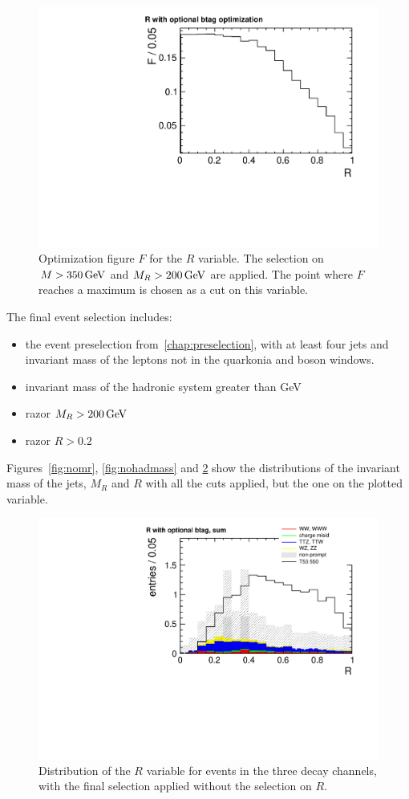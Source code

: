 \begin{figure}[phtb]
    \centering
    \includegraphics[width=.7\textwidth]{images/pdf/cut_opt_r_optional_btag_4jets_AND_mr200_AND_had_mass350}
    \caption{Optimization figure $F$ for the $R$ variable. The selection
        on $M > \unit[350]{GeV}$ and $M_R > \unit[200]{GeV}$ are
    applied. The point where $F$ reaches a maximum is chosen as a cut on this variable.}
    \label{fig:opt_r}
\end{figure}

The final event selection includes:
\begin{itemize}\label{page:razor_selection}
    \item the event preselection from~\ref{chap:preselection}, with at least
        four jets and invariant mass of the leptons not in the quarkonia and
        \Z boson windows.
    \item invariant mass of the hadronic system greater than
        \unit[350]{GeV}
    \item razor $M_R > \unit[200]{GeV}$
    \item razor $R > 0.2$
\end{itemize}
Figures~\ref{fig:nomr}, \ref{fig:nohadmass} and \ref{fig:nor} show the distributions of the invariant mass of the jets,
$M_R$ and $R$ with all the cuts applied, but the one on the plotted
variable.

\begin{figure}[htb]
    \centering
    \includegraphics[width=.7\textwidth]{images/pdf/4jets_AND_mr200_AND_had_mass350/r_optional_btag_sum_0}
    \caption{Distribution of the $R$ variable for events in the three decay
        channels, with the final
    selection applied without the selection on $R$.}
    \label{fig:nor}
\end{figure}

